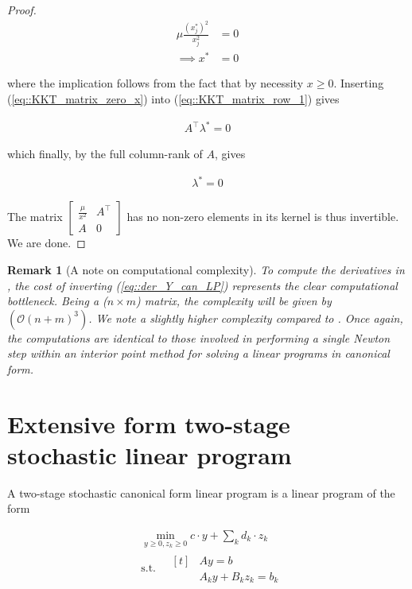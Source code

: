 \documentclass[12pt]{article}
\newcommand{\dotprod}[2]{#1\mathbin{\cdot}#2}
\newcommand{\matmul}[2]{#1 #2}
\newcommand{\st}{\text{s.t.}}
\newtheorem{remark}{Remark}
\begin{document}
\begin{proof}
\begin{align}
    \label{eq::KKT_matrix_zero_x}
    \nonumber \mu \frac{(x_j^*)^2}{x_j^2} &= 0 \\
    \implies x^* & = 0
\end{align}

where the implication follows from the fact that by necessity $x\geq 0$. Inserting (\ref{eq::KKT_matrix_zero_x}) into (\ref{eq::KKT_matrix_row_1}) gives

\begin{align}
    A^\top \lambda^* = 0
\end{align}

which finally, by the full column-rank of $A$, gives

\begin{align}
    \lambda^*=0
\end{align}

The matrix
$\begin{bmatrix}
    \frac{\mu}{x^2} & A^\top \\
    A & 0
    \end{bmatrix}$
has no non-zero elements in its kernel is thus invertible. We are done.

\end{proof}

\begin{remark}[A note on computational complexity]
To compute the derivatives in , the cost of inverting (\ref{eq::der_Y_can_LP})
represents the clear computational bottleneck. Being a ($n\times m$) matrix, the complexity will be given by $(\mathcal{O}(n+m)^3)$.
We note a slightly higher complexity compared to .
Once again, the computations are identical to those involved in performing a single Newton step within an interior point method
for solving a linear programs in canonical form.
\end{remark}

\section{Extensive form two-stage stochastic linear program}
A two-stage stochastic canonical form linear program is a linear program of the form

\begin{align}
    \label{prob::Two_stage_linear_extensive_form}
    & \min_{y \geq 0, z_k \geq 0}  \dotprod{c}{y} + \sum_k \dotprod{d_k}{z_k} \\
    & \st \quad  \begin{aligned}[t] 
        & \matmul{A}{y} = b \\
        & \matmul{A_k}{y} + \matmul{B_k}{z_k} = b_k
    \end{aligned}\\
\end{align}
\end{document}
